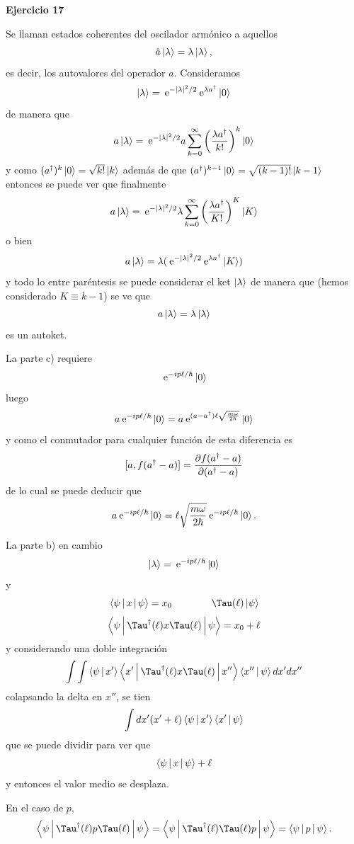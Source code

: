 \documentclass[10pt,oneside]{CBFT_book}
\begin{document}
\begin{ejemplo}{\bf Ejercicio 17}

Se llaman estados coherentes del oscilador armónico a aquellos
\[
	\hat{a} \Ket{\lambda} = \lambda \Ket{\lambda},
\]
es decir, los autovalores del operador $a$.
Consideramos
\[
	\Ket{\lambda} = \:\mathrm{e}^{-|\lambda|^2/2} \:\mathrm{e}^{\lambda a^\dagger} \Ket{0}
\]
de manera que 
\[
	a \Ket{\lambda} = \:\mathrm{e}^{-|\lambda|^2/2} a \sum_{k=0}^\infty \left( \frac{ \lambda a^\dagger }{ k! } \right)^k \Ket{0}
\]
y como $ (a^\dagger)^k \Ket{0} = \sqrt{k!} \Ket{k}$ además de que 
$ (a^\dagger)^{k-1} \Ket{0} = \sqrt{(k-1)!} \Ket{k-1}$
entonces se puede ver que finalmente
\[
	a \Ket{\lambda} = \:\mathrm{e}^{-|\lambda|^2/2} \lambda 
	\sum_{k=0}^\infty \left( \frac{ \lambda a^\dagger }{ K! } \right)^K \Ket{K}
\]
o bien
\[
	a \Ket{\lambda} = \lambda ( \:\mathrm{e}^{-|\lambda|^2/2} \:\mathrm{e}^{ \lambda a^\dagger }  \Ket{K})
\]
y todo lo entre paréntesis se puede considerar el ket $\Ket{\lambda}$ de manera que
(hemos considerado $ K\equiv k-1$) se ve que
\[
	a \Ket{\lambda} = \lambda \Ket{\lambda}
\]
es un autoket.

La parte c) requiere
\[
	\:\mathrm{e}^{- i p \ell / \hbar } \Ket{ 0 }
\]
luego
\[
	a \:\mathrm{e}^{- i p \ell / \hbar } \Ket{ 0 } =
	a \:\mathrm{e}^{ ( a - a^\dagger ) \ell \sqrt{\frac{m\omega}{2\hbar}} } \Ket{ 0 }
\]
y como el conmutador para cualquier función de esta diferencia es
\[
	[ a, f(a^\dagger -a)] = \frac{\partial^{\hspace{-0.05em}} {f(a^\dagger -a)}}{\partial {(a^\dagger -a)}^{\hspace{-0.05em}}}
\]
de lo cual se puede deducir que
\[
	a \:\mathrm{e}^{- i p \ell / \hbar } \Ket{ 0 } =
	\ell \sqrt{\frac{m\omega}{2\hbar}} \:\mathrm{e}^{- i p \ell / \hbar } \Ket{ 0 }.
\]

La parte b) en cambio 
\[
	\Ket{\lambda} = \:\mathrm{e}^{- i p \ell / \hbar } \Ket{ 0 }
\]
y
\[
	\Braket{\psi|x|\psi} = x_0 \qquad \qquad 
	\Tau (\ell) \Ket{\psi}
\]
\[
	\Braket{ \psi | \Tau^\dagger(\ell) x \Tau (\ell) | \psi } = x_0 + \ell 
\]
y considerando una doble integración
\[
	\int \int \Braket{\psi|x'}\Braket{ x' | \Tau^\dagger(\ell) x 
	\Tau (\ell) | x'' }\Braket{x''|\psi} dx' dx''
\] 
colapsando la delta en $x''$, se tien
\[
	\int dx' (x'+\ell) \Braket{\psi|x'} \Braket{x'|\psi}
\]
que se puede dividir para ver que
\[
	\Braket{ \psi | x | \psi } + \ell 
\]
y entonces el valor medio se desplaza.

En el caso de $p$,
\[
	\Braket{ \psi | \Tau^\dagger(\ell) p \Tau (\ell) | \psi } =
	\Braket{ \psi | \Tau^\dagger(\ell) \Tau (\ell) p | \psi } =
	\Braket{ \psi | p | \psi }.
\]
 
\end{ejemplo}
\end{document}
